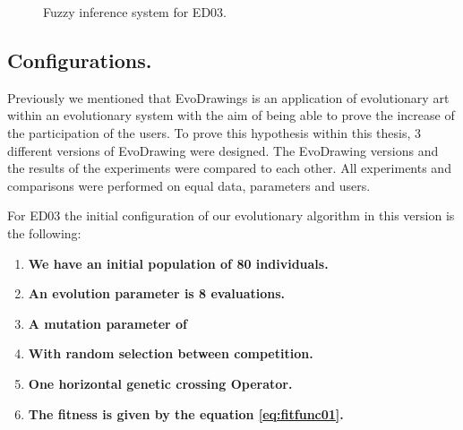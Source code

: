 \begin{figure}
\captionsetup{justification=centering,margin=2cm}
\centering
\setlength\fboxsep{0pt}
\setlength\fboxrule{0.7pt}
\caption{Fuzzy inference system for ED03.}
\label{fig:fis_02}       
\end{figure}


\subsection{Configurations.}

Previously we mentioned that EvoDrawings is an application of evolutionary art
within an evolutionary system with the aim of being able to prove the increase
of the participation of the users. To prove this hypothesis within this thesis,
3 different versions of EvoDrawing were designed. The EvoDrawing versions and
the results of the experiments were compared to each other. All experiments and
comparisons were performed on equal data, parameters and users.

For ED03 the initial configuration of our evolutionary algorithm in this version
is the following:

\begin{enumerate}
	\item  \textbf{We have an initial population of 80 individuals.}
	
	\item  \textbf{An evolution parameter is 8 evaluations.}
	
	\item  \textbf{A mutation parameter of } 
	\item  \textbf{With random selection between competition.} 
	\item  \textbf{One horizontal genetic crossing Operator.}
	\item  \textbf{The fitness is given by the equation \ref{eq:fitfunc01}.}
\end{enumerate}

